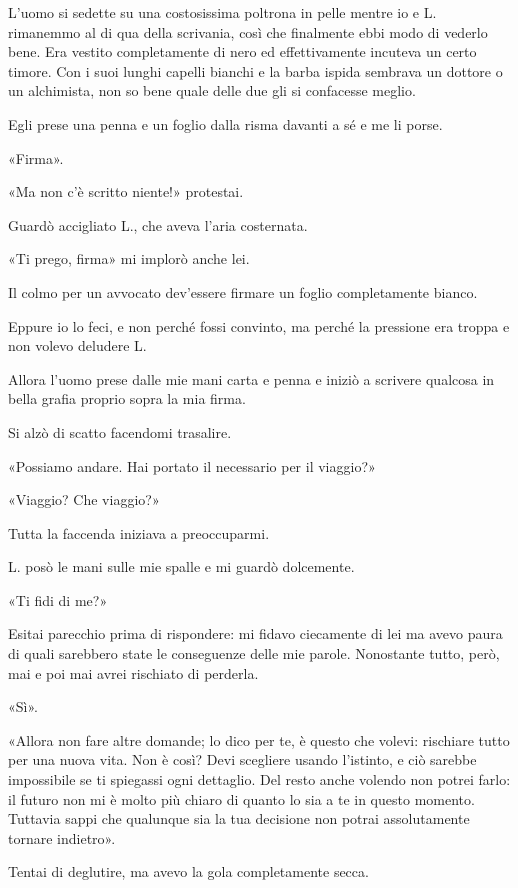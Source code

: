 \documentclass[a4paper,11pt,oneside,openright,final]{memoir}
\begin{document}
L'uomo si sedette su una costosissima poltrona in pelle mentre io e L.
rimanemmo al di qua della scrivania, così che finalmente ebbi modo di vederlo
bene. Era vestito completamente di nero ed effettivamente incuteva un certo
timore. Con i suoi lunghi capelli bianchi e la barba ispida sembrava un dottore
o un alchimista, non so bene quale delle due gli si confacesse meglio.

Egli prese una penna e un foglio dalla risma davanti a sé e me li porse.

«Firma».

«Ma non c'è scritto niente!» protestai.

Guardò accigliato L., che aveva l'aria costernata.

«Ti prego, firma» mi implorò anche lei.

Il colmo per un avvocato dev'essere firmare un foglio completamente bianco.

Eppure io lo feci, e non perché fossi convinto, ma perché la pressione era
troppa e non volevo deludere L.

Allora l'uomo prese dalle mie mani carta e penna e iniziò a scrivere qualcosa in
bella grafia proprio sopra la mia firma.

Si alzò di scatto facendomi trasalire.

«Possiamo andare. Hai portato il necessario per il viaggio?»

«Viaggio? Che viaggio?»

Tutta la faccenda iniziava a preoccuparmi.

L. posò le mani sulle mie spalle e mi guardò dolcemente.

«Ti fidi di me?»

Esitai parecchio prima di rispondere: mi fidavo ciecamente di lei ma avevo
paura di quali sarebbero state le conseguenze delle mie parole. Nonostante
tutto, però, mai e poi mai avrei rischiato di perderla.

«Sì».

«Allora non fare altre domande; lo dico per te, è questo che volevi: rischiare
tutto per una nuova vita. Non è così? Devi scegliere usando l'istinto, e
ciò sarebbe impossibile se ti spiegassi ogni dettaglio. Del resto anche
volendo non potrei farlo: il futuro non mi è molto più chiaro di quanto lo
sia a te in questo momento. Tuttavia sappi che qualunque sia la tua decisione
non potrai assolutamente tornare indietro».

Tentai di deglutire, ma avevo la gola completamente secca.
\end{document}
